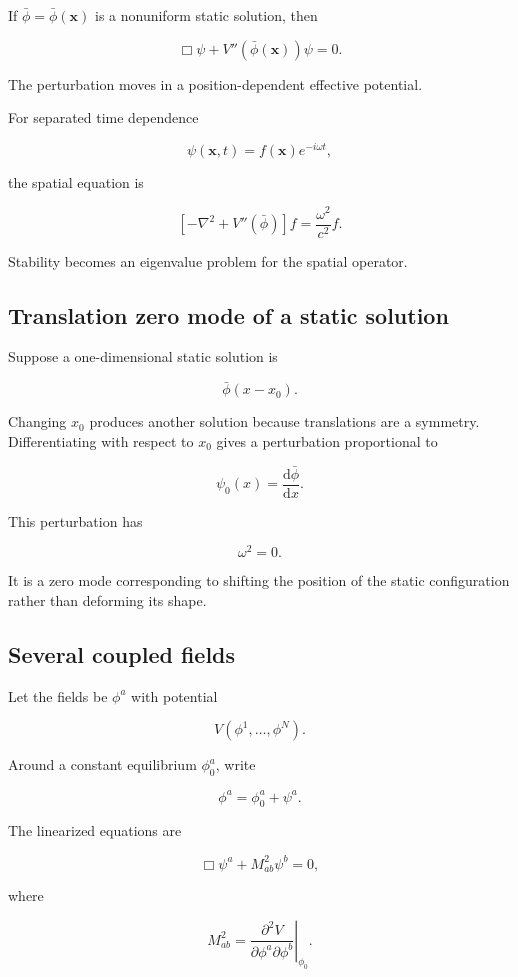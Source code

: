 If \(\bar\phi=\bar\phi(\mathbf{x})\) is a nonuniform static solution, then

\[
\boxed{
\Box\psi
+
V''(\bar\phi(\mathbf{x}))
\psi
=0
}.
\]

The perturbation moves in a position-dependent effective potential.

For separated time dependence

\[
\psi(\mathbf{x},t)
=
f(\mathbf{x})e^{-i\omega t},
\]

the spatial equation is

\[
\boxed{
\left[
-\nabla^{2}
+
V''(\bar\phi)
\right]
f
=
\frac{\omega^{2}}{c^{2}}f
}.
\]

Stability becomes an eigenvalue problem for the spatial operator.

\subsection{Translation zero mode of a static solution}

Suppose a one-dimensional static solution is

\[
\bar\phi(x-x_{0}).
\]

Changing \(x_{0}\) produces another solution because translations are a symmetry. Differentiating with respect to \(x_{0}\) gives a perturbation proportional to

\[
\boxed{
\psi_{0}(x)
=
\frac{\mathrm{d}\bar\phi}{\mathrm{d}x}
}.
\]

This perturbation has

\[
\omega^{2}=0.
\]

It is a zero mode corresponding to shifting the position of the static configuration rather than deforming its shape.

\subsection{Several coupled fields}

Let the fields be \(\phi^{a}\) with potential

\[
V(\phi^{1},\ldots,\phi^{N}).
\]

Around a constant equilibrium \(\phi_{0}^{a}\), write

\[
\phi^{a}
=
\phi_{0}^{a}
+
\psi^{a}.
\]

The linearized equations are

\[
\boxed{
\Box\psi^{a}
+
M^{2}_{ab}\psi^{b}
=0
},
\]

where

\[
\boxed{
M^{2}_{ab}
=
\left.
\frac{\partial^{2}V}
{\partial\phi^{a}\partial\phi^{b}}
\right|_{\phi_{0}}
}.
\]

